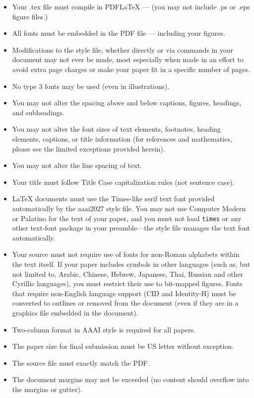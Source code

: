 \begin{itemize}
\item Your .tex file must compile in PDF\LaTeX{} --- (you may not include .ps or .eps figure files.)
\item All fonts must be embedded in the PDF file --- including your figures.
\item Modifications to the style file, whether directly or via commands in your document may not ever be made, most especially when made in an effort to avoid extra page charges or make your paper fit in a specific number of pages.
\item No type 3 fonts may be used (even in illustrations).
\item You may not alter the spacing above and below captions, figures, headings, and subheadings.
\item You may not alter the font sizes of text elements, footnotes, heading elements, captions, or title information (for references and mathematics, please see the limited exceptions provided herein).
\item You may not alter the line spacing of text.
\item Your title must follow Title Case capitalization rules (not sentence case).
\item \LaTeX{} documents must use the Times-like serif text font provided automatically by the aaai2027 style file. You may not use Computer Modern or Palatino for the text of your paper, and you must not load \texttt{times} or any other text-font package in your preamble---the style file manages the text font automatically.
\item Your source must not require use of fonts for non-Roman alphabets within the text itself. If your paper includes symbols in other languages (such as, but not limited to, Arabic, Chinese, Hebrew, Japanese, Thai, Russian and other Cyrillic languages), you must restrict their use to bit-mapped figures. Fonts that require non-English language support (CID and Identity-H) must be converted to outlines or removed from the document (even if they are in a graphics file embedded in the document).
\item Two-column format in AAAI style is required for all papers.
\item The paper size for final submission must be US letter without exception.
\item The source file must exactly match the PDF.
\item The document margins may not be exceeded (no content should overflow into the margins or gutter).

\end{itemize}

